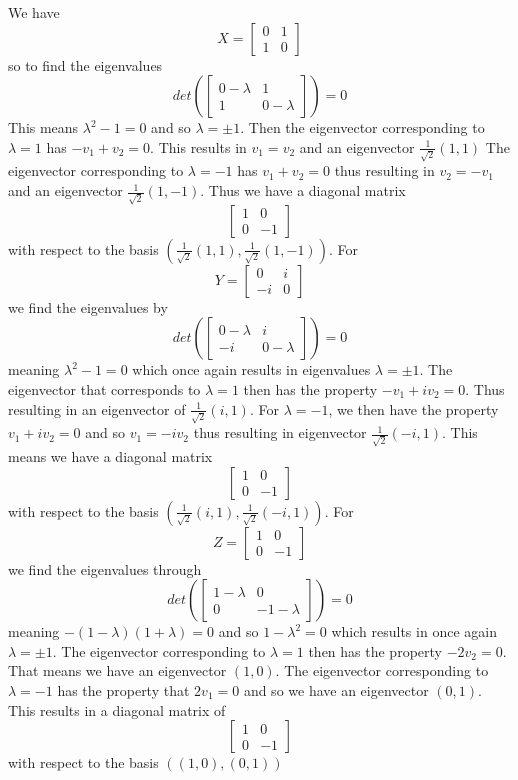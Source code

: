 We have 
\[X =
\begin{bmatrix}
    0 & 1\\ 
    1 & 0
\end{bmatrix}\]
so to find the eigenvalues
\[det\left(\begin{bmatrix}
    0-\lambda & 1\\ 
    1 & 0-\lambda
\end{bmatrix}\right) = 0
\]
This means $ \lambda^2 -1 = 0$ and so $ \lambda = \pm 1$. Then the eigenvector corresponding to $\lambda = 1$ has $ -v_1 + v_2 = 0$. This results in $ v_1 = v_2$ and an eigenvector $\frac{1}{\sqrt{2}}(1,1)$
The eigenvector corresponding to $\lambda= -1$ has $v_1 +v_2 = 0 $ thus resulting in $v_2 = -v_1$ and an eigenvector $\frac{1}{\sqrt{2}}(1,-1)$. Thus we have a diagonal matrix 
\[\begin{bmatrix}
    1 & 0\\
    0 & -1
\end{bmatrix}\] with respect to the basis $\left(\frac{1}{\sqrt{2}}(1,1), \frac{1}{\sqrt{2}}(1,-1)\right)$.
For 
\[Y=
\begin{bmatrix}
   0 & i \\
   -i & 0
\end{bmatrix}
\]
we find the eigenvalues by
\[det\left(\begin{bmatrix}
    0-\lambda & i\\ 
    -i & 0-\lambda
\end{bmatrix}\right) = 0\]
meaning $ \lambda^2 -1 = 0$ which once again results in eigenvalues $\lambda = \pm 1$. The eigenvector that corresponds to $\lambda = 1$ then has the property $ -v_1 +iv_2 = 0$. Thus resulting in an eigenvector of $\frac{1}{\sqrt{2}}(i, 1)$. For $\lambda = -1$, we then have the property $ v_1+iv_2 = 0$ and so $v_1 = -iv_2$ thus resulting in eigenvector $ \frac{1}{\sqrt{2}}(-i, 1)$. This means we have a diagonal matrix \[\begin{bmatrix}
    1 & 0\\
    0 & -1
\end{bmatrix}\] with respect to the basis $\left(\frac{1}{\sqrt{2}}(i, 1), \frac{1}{\sqrt{2}}(-i, 1)\right)$. For
\[Z = 
\begin{bmatrix}
    1 & 0\\
    0 & -1
\end{bmatrix}\]
we find the eigenvalues through 
\[det\left(\begin{bmatrix}
    1-\lambda & 0\\ 
    0 & -1-\lambda
\end{bmatrix}\right) = 0\]
meaning $ -(1-\lambda)(1+\lambda) = 0$ and so $ 1-\lambda^2 = 0$ which results in once again $\lambda = \pm 1$. The eigenvector corresponding to $ \lambda = 1$ then has the property $-2v_2 = 0$. That means we have an eigenvector $(1,0)$. The eigenvector corresponding to $\lambda = -1$ has the property that $2v_1 = 0$ and so we have an eigenvector $(0,1)$. This results in a diagonal matrix of
\[\begin{bmatrix}
    1 & 0\\
    0 & -1
\end{bmatrix}\]
with respect to the basis $ \left((1,0),(0,1)\right)$

